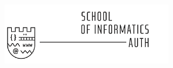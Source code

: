 \documentclass[a4paper,12pt]{article}
\begin{document}
\begin{titlepage}
		\includegraphics{csd.png}\\[1cm] %
		
		
		\vfill %
		
	\end{titlepage}




\tableofcontents



\cleardoublepage

\printbibliography[heading=bibintoc]
\end{document}
